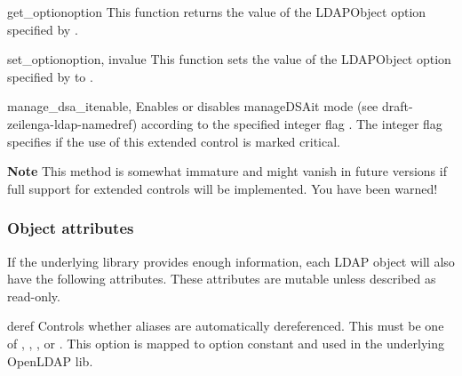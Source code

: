 \begin{methoddesc}[LDAPObject]{get_option}{option} %
  This function returns the value of the LDAPObject option
  specified by .
\end{methoddesc}

\begin{methoddesc}[LDAPObject]{set_option}{option, invalue} %
  This function sets the value of the LDAPObject option
  specified by  to .
\end{methoddesc}


\begin{methoddesc}[LDAPObject]{manage_dsa_it}{enable, }
Enables or disables manageDSAit mode (see draft-zeilenga-ldap-namedref)
according to the specified integer flag . The
integer flag  specifies if the use of this extended
control is marked critical.

\textbf{Note}
This method is somewhat immature and might vanish in future versions
if full support for extended controls will be implemented. You have been
warned!
\end{methoddesc}


\subsubsection{Object attributes}

If the underlying library provides enough information,
each LDAP object will also have the following attributes.
These attributes are mutable unless described as read-only.


\begin{memberdesc}[LDAP]{deref} %
    Controls whether aliases are automatically dereferenced.
    This must be one of
    , , ,
    or .
    This option is mapped to option constant 
    and used in the underlying OpenLDAP lib.
\end{memberdesc}



